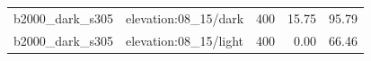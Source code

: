 \begin{longtable}{l>{\raggedright\arraybackslash}p{.42\linewidth}rrr}
b2000\_\allowbreak{}dark\_\allowbreak{}s305 & %
elevation:08\_\allowbreak{}15/dark & %
400 & %
15.75 & %
95.79 \\ %

b2000\_\allowbreak{}dark\_\allowbreak{}s305 & %
elevation:08\_\allowbreak{}15/light & %
400 & %
0.00 & %
66.46 \\ %


\end{longtable}
